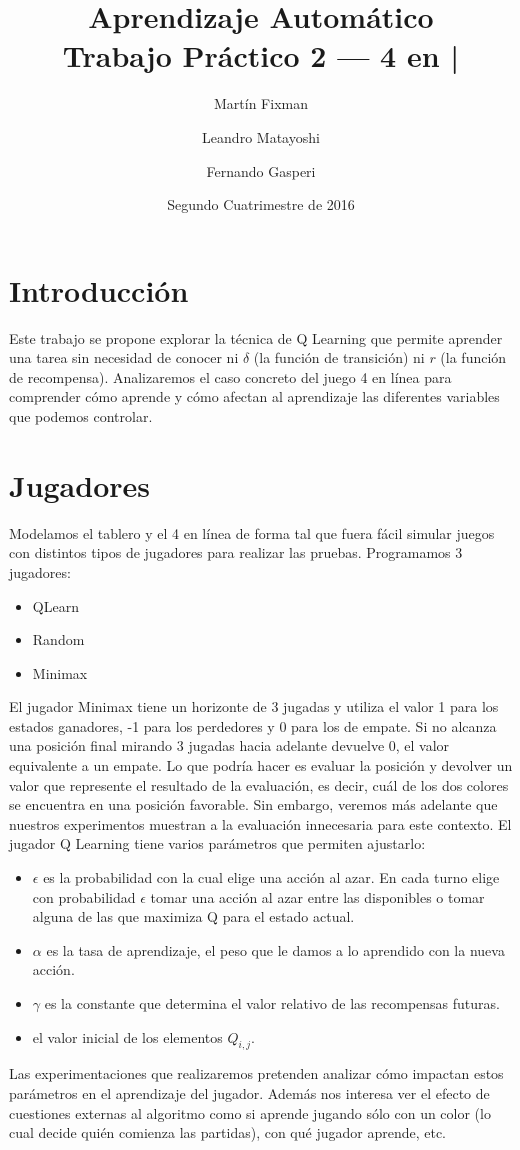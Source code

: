 \documentclass{article}
\title{Aprendizaje Automático \\ Trabajo Práctico 2 --- 4 en |}
\author{Martín Fixman \and Leandro Matayoshi \and Fernando Gasperi}
\date{Segundo Cuatrimestre de 2016}
\begin{document}
\maketitle

\newpage

\section{Introducción}

Este trabajo se propone explorar la técnica de Q Learning que permite aprender una tarea
sin necesidad de conocer ni $\delta$ (la función de transición) ni $r$ (la función de recompensa).
Analizaremos el caso concreto del juego 4 en línea para comprender cómo aprende y cómo afectan
al aprendizaje las diferentes variables que podemos controlar.

\section{Jugadores}

Modelamos el tablero y el 4 en línea de forma tal que fuera fácil simular juegos con distintos tipos de jugadores para
realizar las pruebas. Programamos 3 jugadores:
\begin{itemize}
  \item QLearn
  \item Random
  \item Minimax
\end{itemize}
El jugador Minimax tiene un horizonte de 3 jugadas y utiliza el valor 1 para los
estados ganadores, -1 para los perdedores y 0 para los de empate. Si no alcanza
una posición final mirando 3 jugadas
hacia adelante devuelve 0, el valor equivalente a un empate. Lo que podría hacer
es evaluar la posición y devolver un valor que represente el resultado de la
evaluación, es decir, cuál de los dos colores se encuentra en una posición
favorable. Sin embargo, veremos más adelante que nuestros experimentos muestran a
la evaluación innecesaria para este contexto.
El jugador Q Learning tiene varios parámetros que permiten ajustarlo:
\begin{itemize}
  \item $\epsilon$ es la probabilidad con la cual elige una acción al azar. En
    cada turno elige con probabilidad $\epsilon$ tomar una acción al azar entre
    las disponibles o tomar alguna de las que maximiza Q para el estado actual.
  \item $\alpha$ es la tasa de aprendizaje, el peso que le damos a lo aprendido
    con la nueva acción.
  \item $\gamma$ es la constante que determina el valor relativo de las
    recompensas futuras.
  \item el valor inicial de los elementos $Q_{i, j}$.
\end{itemize}
Las experimentaciones que realizaremos pretenden analizar cómo impactan estos
parámetros en el aprendizaje del jugador. Además nos interesa ver el efecto de
cuestiones externas al algoritmo como si aprende jugando sólo con un color (lo
cual decide quién comienza las partidas), con qué jugador aprende, etc.
\end{document}
